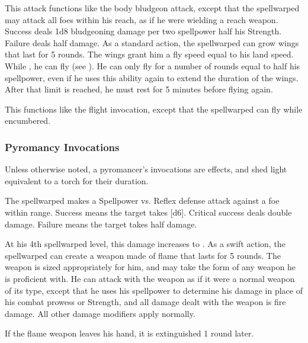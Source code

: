             This attack functions like the body bludgeon attack, except that the spellwarped may attack all foes within his reach, as if he were wielding a reach weapon.
            Success deals 1d8 bludgeoning damage per two spellpower \add half his Strength.
            Failure deals half damage.
            As a standard action, the spellwarped can grow wings that last for 5 rounds.
            The wings grant him a fly speed equal to his land speed.
            While \unencumbered, he can fly (see ).
            He can only fly for a number of rounds equal to half his spellpower, even if he uses this ability again to extend the duration of the wings.
            After that limit is reached, he must rest for 5 minutes before flying again.

            This functions like the flight invocation, except that the spellwarped can fly while encumbered.

        \subsubsection{Pyromancy Invocations}
            Unless otherwise noted, a pyromancer's invocations are  effects, and shed light equivalent to a torch for their duration.

            The spellwarped makes a Spellpower vs. Reflex defense attack against a foe within \rngmed range.
            Success means the target takes [d6].
            Critical success deals double damage.
            Failure means the target takes half damage.
            \par At his 4th spellwarped level, this damage increases to .
            As a swift action, the spellwarped can create a weapon made of flame that lasts for 5 rounds.
            The weapon is sized appropriately for him, and may take the form of any weapon he is proficient with.
            He can attack with the weapon as if it were a normal weapon of its type, except that he uses his spellpower to determine his damage in place of his combat prowess or Strength, and all damage dealt with the weapon is fire damage.
            All other damage modifiers apply normally.
            \par If the flame weapon leaves his hand, it is extinguished 1 round later.

